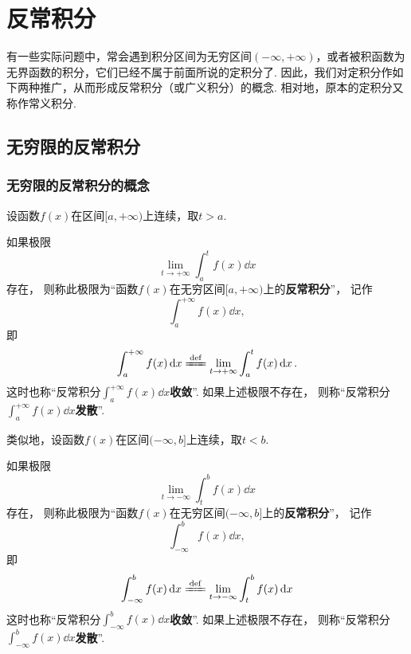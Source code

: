 \chapter{反常积分}
有一些实际问题中，常会遇到积分区间为无穷区间\((-\infty,+\infty)\)，或者被积函数为无界函数的积分，它们已经不属于前面所说的定积分了.
因此，我们对定积分作如下两种推广，从而形成反常积分（或广义积分）的概念.
相对地，原本的定积分又称作常义积分.

\section{无穷限的反常积分}
\subsection{无穷限的反常积分的概念}
\begin{definition}\label{definition:定积分.无穷限的反常积分的定义1}
设函数\(f(x)\)在区间\([a,+\infty)\)上连续，取\(t > a\).

如果极限\[
\lim\limits_{t \to +\infty} \int_a^t f(x) \dd{x}
\]存在，%
则称此极限为“函数\(f(x)\)在无穷区间\([a,+\infty)\)上的\textbf{反常积分}”，%
记作\[
\int_a^{+\infty} f(x) \dd{x},
\]
即
\begin{equation}
\int_a^{+\infty} f(x) \dd{x}
\defeq
\lim\limits_{t \to +\infty} \int_a^t f(x) \dd{x}.
\end{equation}
这时也称“反常积分\(\int_a^{+\infty} f(x) \dd{x}\)\textbf{收敛}”.
如果上述极限不存在，%
则称“反常积分\(\int_a^{+\infty} f(x) \dd{x}\)\textbf{发散}”.
\end{definition}

\begin{definition}\label{definition:定积分.无穷限的反常积分的定义2}
类似地，设函数\(f(x)\)在区间\((-\infty,b]\)上连续，取\(t < b\).

如果极限\[
\lim\limits_{t \to -\infty} \int_t^b f(x) \dd{x}
\]存在，%
则称此极限为“函数\(f(x)\)在无穷区间\((-\infty,b]\)上的\textbf{反常积分}”，%
记作\[
\int_{-\infty}^b f(x) \dd{x},
\]
即
\begin{equation}
\int_{-\infty}^b f(x) \dd{x}
\defeq
\lim\limits_{t \to -\infty} \int_t^b f(x) \dd{x}
\end{equation}
这时也称“反常积分\(\int_{-\infty}^b f(x) \dd{x}\)\textbf{收敛}”.
如果上述极限不存在，%
则称“反常积分\(\int_{-\infty}^b f(x) \dd{x}\)\textbf{发散}”.
\end{definition}

